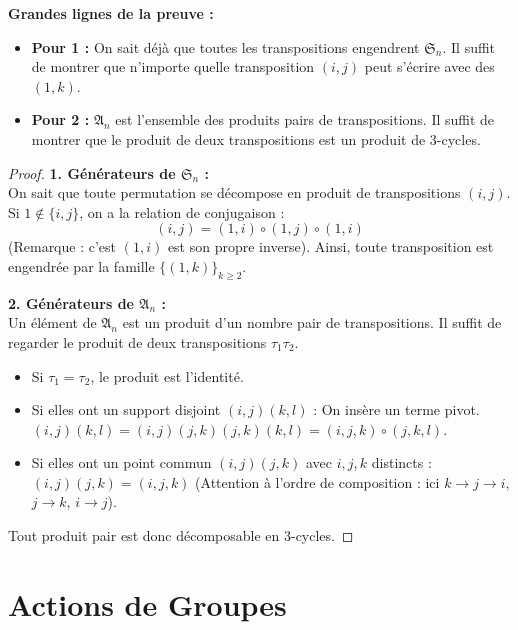 \documentclass{prepacours}
\begin{document}
\noindent \textbf{Grandes lignes de la preuve :}
\begin{itemize}
    \item \textbf{Pour 1 :} On sait déjà que toutes les transpositions engendrent $\mathfrak{S}_n$. Il suffit de montrer que n'importe quelle transposition $(i, j)$ peut s'écrire avec des $(1, k)$.
    \item \textbf{Pour 2 :} $\mathfrak{A}_n$ est l'ensemble des produits pairs de transpositions. Il suffit de montrer que le produit de deux transpositions est un produit de 3-cycles.
\end{itemize}

\begin{proof}
    \textbf{1. Générateurs de $\mathfrak{S}_n$ :} \\
    On sait que toute permutation se décompose en produit de transpositions $(i, j)$.
    Si $1 \notin \{i, j\}$, on a la relation de conjugaison :
    \[ (i, j) = (1, i) \circ (1, j) \circ (1, i) \]
    (Remarque : c'est $(1,i)$ est son propre inverse).
    Ainsi, toute transposition est engendrée par la famille $\{(1, k)\}_{k \ge 2}$.
    
    \textbf{2. Générateurs de $\mathfrak{A}_n$ :} \\
    Un élément de $\mathfrak{A}_n$ est un produit d'un nombre pair de transpositions. Il suffit de regarder le produit de deux transpositions $\tau_1 \tau_2$.
    \begin{itemize}
        \item Si $\tau_1 = \tau_2$, le produit est l'identité.
        \item Si elles ont un support disjoint $(i, j)(k, l)$ : On insère un terme pivot.
        $(i, j)(k, l) = (i, j)(j, k)(j, k)(k, l) = (i, j, k) \circ (j, k, l)$.
        \item Si elles ont un point commun $(i, j)(j, k)$ avec $i, j, k$ distincts :
        $(i, j)(j, k) = (i, j, k)$ (Attention à l'ordre de composition : ici $k \to j \to i$, $j \to k$, $i \to j$).
    \end{itemize}
    Tout produit pair est donc décomposable en 3-cycles.
\end{proof}

\section{Actions de Groupes}
\end{document}

